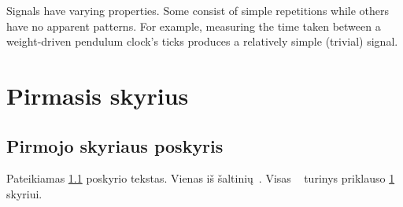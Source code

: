 \documentclass[a4paper,12pt,fleqn]{article}
\begin{document}
Signals have varying properties. Some consist of simple repetitions while others
have no apparent patterns.
For example, measuring the time taken between a weight-driven
pendulum clock's ticks produces a relatively simple (trivial) signal.




















\newpage

\section{Pirmasis skyrius}
\label{sec:motivation}
\subsection{Pirmojo skyriaus poskyris}
\label{sec:example}
Pateikiamas \ref{sec:example} poskyrio tekstas. Vienas iš šaltinių~\cite{KTZ}. Visas ~\cite{KTV} turinys priklauso \ref{sec:motivation} skyriui.
\end{document}
